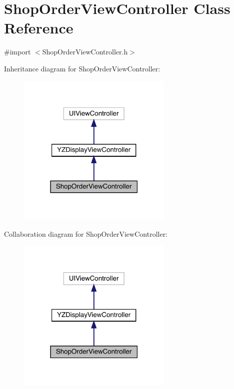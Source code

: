 \hypertarget{interface_shop_order_view_controller}{}\section{Shop\+Order\+View\+Controller Class Reference}
\label{interface_shop_order_view_controller}


{\ttfamily \#import $<$Shop\+Order\+View\+Controller.\+h$>$}



Inheritance diagram for Shop\+Order\+View\+Controller\+:\nopagebreak
\begin{figure}[H]
\begin{center}
\leavevmode
\includegraphics[width=210pt]{interface_shop_order_view_controller__inherit__graph}
\end{center}
\end{figure}


Collaboration diagram for Shop\+Order\+View\+Controller\+:\nopagebreak
\begin{figure}[H]
\begin{center}
\leavevmode
\includegraphics[width=210pt]{interface_shop_order_view_controller__coll__graph}
\end{center}
\end{figure}

